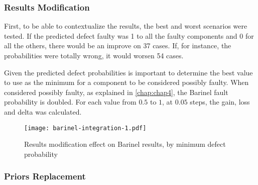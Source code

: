 \subsubsection{Results Modification}

First, to be able to contextualize the results, the best and worst scenarios were tested. If the predicted defect faulty was 1 to all the faulty components and 0 for all the others, there would be an improve on 37 cases. If, for instance, the probabilities were totally wrong, it would worsen 54 cases.

Given the predicted defect probabilities is important to determine the best value to use as the minimum for a component to be considered possibly faulty. When considered possibly faulty, as explained in \ref{chap:chap4}, the Barinel fault probability is doubled. For each value from $0.5$ to $1$, at $0.05$ steps, the gain, loss and delta was calculated.
%
\begin{figure}[H]
  \begin{center}
    \leavevmode
    \texttt{[image: barinel-integration-1.pdf]}
    \caption{Results modification effect on Barinel results, by minimum defect probability}
    \label{fig:results-modification}
  \end{center}
\end{figure}


\subsubsection{Priors Replacement}






